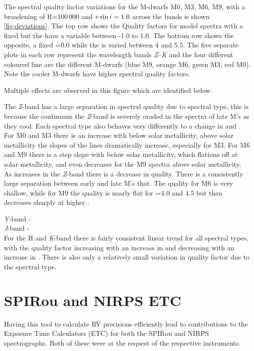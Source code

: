 The spectral quality factor variations for the {M-dwarf}s M0, M3, M6, M9, with a broadening of R=100\,000 and $v\sin{i}=1.0$\kmps{} across the \nir{} bands is shown \cref{fig:deviations}. The top row shows the Quality factors for model spectra with a fixed  but the have a variable \feh{} between -1.0 to 1.0.
The bottom row shows the opposite, a fixed \feh{}=0.0 while the \Logg{} is varied between 4 and 5.5.
The five separate plots in each row represent the \nir{} wavelength bands \emph{Z}--\emph{K} and the four different coloured line are the different M-dwarfs (blue M9, orange M6, green M3, red M0).
Note the cooler M-dwarfs have higher spectral quality factors.
\todo{}

Multiple effects are observed in this figure which are identified below.


The \emph{Z}-band has a large separation in spectral quality due to spectral type, this is because the continuum the \emph{Z}-band is severely eroded in the spectra of late M's as they cool.
Each spectral type also behaves very differently to a change in \feh{} and \Logg{}.
For {M0} and {M3} there is an increase with \feh{} below solar metallicity, above solar metallicity the slopes of the lines dramatically increase, especially for {M3}.
For {M6} and {M9} there is a step slope with \feh{} below solar metallicity, which flattens off at solar metallicity, and even decreases for the {M9} spectra above solar metallicity.
As \Logg{} increases in the \emph{Z}-band there is a decrease in quality.
There is a consistently large separation between early and late M's that.
The quality for {M6} is very shallow, while for {M9} the quality is nearly flat for \Logg{}=4.0 and 4.5 but then decreases sharply at higher \Logg{}.

\emph{Y}-band -\\

\emph{J}-band - \\

For the H and \emph{K}-band there is fairly consistent linear trend for all spectral types, with the quality factor increasing with an increase in \feh{} and decreasing with an increase in \Logg{}.
There is also only a relatively small variation in quality factor due to the spectral type.



\clearpage


\section{{SPIRou} and {NIRPS} {ETC}}\label{sec:spirou_nirps_etc}
Having this tool to calculate {RV} precisions efficiently lead to contributions to the Exposure Time Calculators (ETC) for both the {SPIRou} and {NIRPS} spectrographs. Both of these were at the request of the respective instruments.

